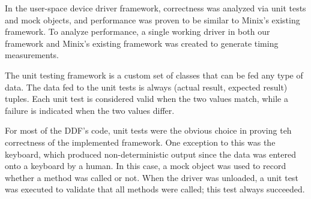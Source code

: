 
In the user-space device driver framework, correctness was analyzed via
unit tests and mock objects, and performance was proven to be similar
to Minix's existing framework.  To analyze performance, a single working
driver in both our framework and Minix's existing framework was created to
generate timing measurements.


The unit testing framework is a custom set of classes that can be fed any type
of data.  The data fed to the unit tests is always
{\important (actual result, expected result)} tuples.
Each unit test is considered valid when the two values match, while a failure is indicated when the two values differ.

%

For most of the DDF's code, unit tests were the obvious choice in proving teh correctness of the implemented framework.  One
exception to this was the keyboard, which produced non-deterministic output
since the data was entered onto a keyboard by a human.  In this case, a mock
object was used to record whether a method was called or not.  When the driver
was unloaded, a unit test was executed to validate that all methods were
called; this test always succeeded.


